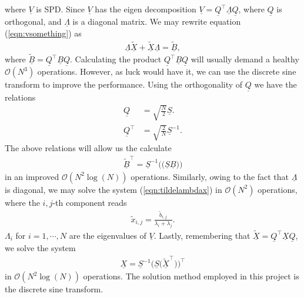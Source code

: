 \documentclass{article}
\begin{document}
where $\underline{V}$ is SPD. Since $\underline{V}$ has the eigen decomposition $\underline{V} = \underline{Q}^\top \underline{\Lambda} \underline{Q}$, where $\underline{Q}$ is orthogonal, and $\underline{\Lambda}$ is a diagonal matrix. We may rewrite equation (\ref{eqn:vsomething}) as
\begin{align}
    \underline{\Lambda} \underline{\tilde{X}} + \underline{\tilde{X}} \underline{\Lambda} = \underline{\tilde{B}}, \label{eqn:tildelambdax}
\end{align}
where $\underline{\tilde{B}} = \underline{Q}^\top \underline{B} \underline{Q}$. Calculating the product $\underline{Q}^\top \underline{B} \underline{Q}$ will usually demand a healthy $\mathcal{O}(N^3)$ operations. However, as luck would have it, we can use the discrete sine transform to improve the performance. Using the orthogonality of $\underline{Q}$ we have the relations
\begin{align*}
    \underline{Q} &= \sqrt{\frac{N}{2}}\underline{S}. \\
    \underline{Q}^\top &= \sqrt{\frac{2}{N}}\underline{S}^{-1}.
\end{align*}
The above relations will allow us the calculate
\begin{align*}
    \underline{\tilde{B}}^\top = \underline{S}^{-1}\Big( \big( \underline{S} \underline{B} \big) \Big)
\end{align*}
in an improved $\mathcal{O}(N^2 \log (N))$ operations. Similarly, owing to the fact that $\underline{\Lambda}$ is diagonal, we may solve the system (\ref{eqn:tildelambdax}) in $\mathcal{O}(N^2)$ operations, where the $i,j$-th component reads
\begin{align*}
    \tilde{x}_{i,j} = \frac{\tilde{b}_{i,j}}{\lambda_i + \lambda_j}.
\end{align*}
$\Lambda_i$ for $i=1,\cdots,N$ are the eigenvalues of $\underline{V}$. Lastly, remembering that $\underline{\tilde{X}} = \underline{Q}^\top \underline{X} \underline{Q}$, we solve the system
\begin{align*}
    \underline{X} = \underline{S}^{-1} \Big(\underline{S} \big(\underline{\tilde{X}}^\top \big) \Big)^\top
\end{align*}
in $\mathcal{O}(N^2 \log(N))$ operations. The solution method employed in this project is the discrete sine transform.

\end{document}
